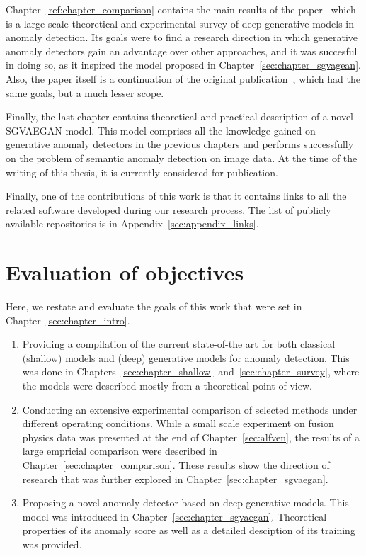Chapter~\ref{ref:chapter_comparison} contains the main results of the paper~\cite{vskvara2021comparison} which is a large-scale theoretical and experimental survey of deep generative models in anomaly detection. Its goals were to find a research direction in which generative anomaly detectors gain an advantage over other approaches, and it was succesful in doing so, as it inspired the model proposed in Chapter~\ref{sec:chapter_sgvagean}. Also, the paper itself is a continuation of the original publication~\cite{vskvara2018generative}, which had the same goals, but a much lesser scope.

Finally, the last chapter contains theoretical and practical description of a novel SGVAEGAN model. This model comprises all the knowledge gained on generative anomaly detectors in the previous chapters and performs successfully on the problem of semantic anomaly detection on image data. At the time of the writing of this thesis, it is currently considered for publication.

Finally, one of the contributions of this work is that it contains links to all the related software developed during our research process. The list of publicly available repositories is in Appendix~\ref{sec:appendix_links}.

\section{Evaluation of objectives}
Here, we restate and evaluate the goals of this work that were set in Chapter~\ref{sec:chapter_intro}.

\begin{enumerate}
	\item Providing a compilation of the current state-of-the art for both classical (shallow) models and (deep) generative models for anomaly detection. This was done in Chapters~\ref{sec:chapter_shallow}~and~\ref{sec:chapter_survey}, where the models were described mostly from a theoretical point of view. 
	\item Conducting an extensive experimental comparison of selected methods under different operating conditions. While a small scale experiment on fusion physics data was presented at the end of Chapter~\ref{sec:alfven}, the results of a large empricial comparison were described in Chapter~\ref{sec:chapter_comparison}. These results show the direction of research that was further explored in Chapter~\ref{sec:chapter_sgvaegan}.
	\item Proposing a novel anomaly detector based on deep generative models. This model was introduced in Chapter~\ref{sec:chapter_sgvaegan}. Theoretical properties of its anomaly score as well as a detailed desciption of its training was provided.
\end{enumerate}
